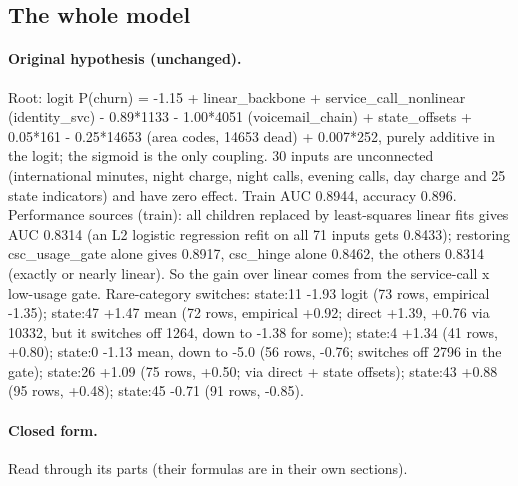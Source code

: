 \documentclass[a4paper,10pt]{article}
\newif\ifreviewmarks
\newcommand{\reviewrule}{\noindent{\color{BrickRed}\rule{\linewidth}{0.8pt}}}
\newenvironment{drafted}[1][]{%
  \ifreviewmarks\par\addvspace{\medskipamount}\reviewrule\par\nopagebreak
  \noindent{\color{BrickRed}\sffamily\footnotesize\textbf{Thesis Draft}\quad #1\hfill review}\par\nopagebreak\smallskip\fi}{%
  \ifreviewmarks\par\smallskip\noindent{\color{BrickRed}\sffamily\footnotesize end of thesis draft}\par\nopagebreak\reviewrule\par\medskip\fi}
\begin{document}
\begin{drafted}[plain-language layer: churn100-s2-c2]
\subsection{The whole model}\label{tech:ann97}
\paragraph{Original hypothesis (unchanged).} Root: logit P(churn) = -1.15 + linear\_\allowbreak{}backbone + service\_\allowbreak{}call\_\allowbreak{}nonlinear (identity\_\allowbreak{}svc) - 0.89*1133 - 1.00*4051 (voicemail\_\allowbreak{}chain) + state\_\allowbreak{}offsets + 0.05*161 - 0.25*14653 (area codes, 14653 dead) + 0.007*252, purely additive in the logit; the sigmoid is the only coupling. 30 inputs are unconnected (international minutes, night charge, night calls, evening calls, day charge and 25 state indicators) and have zero effect. Train AUC 0.8944, accuracy 0.896. Performance sources (train): all children replaced by least-squares linear fits gives AUC 0.8314 (an L2 logistic regression refit on all 71 inputs gets 0.8433); restoring csc\_\allowbreak{}usage\_\allowbreak{}gate alone gives 0.8917, csc\_\allowbreak{}hinge alone 0.8462, the others 0.8314 (exactly or nearly linear). So the gain over linear comes from the service-call x low-usage gate. Rare-category switches: state:11 -1.93 logit (73 rows, empirical -1.35); state:47 +1.47 mean (72 rows, empirical +0.92; direct +1.39, +0.76 via 10332, but it switches off 1264, down to -1.38 for some); state:4 +1.34 (41 rows, +0.80); state:0 -1.13 mean, down to -5.0 (56 rows, -0.76; switches off 2796 in the gate); state:26 +1.09 (75 rows, +0.50; via direct + state offsets); state:43 +0.88 (95 rows, +0.48); state:45 -0.71 (91 rows, -0.85).
\paragraph{Closed form.} Read through its parts (their formulas are in their own sections).

\end{drafted}
\end{document}
